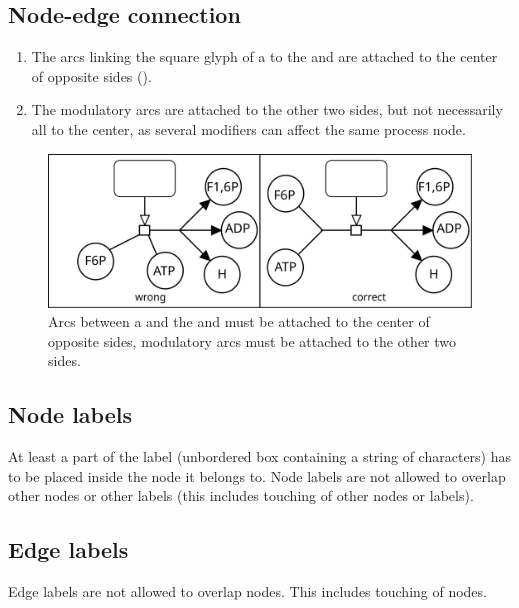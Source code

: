 \subsection{Node-edge connection}

\begin{enumerate}
\item The arcs linking the square glyph of a  to the
   and  are attached to the
  center of opposite sides ().
\item The modulatory arcs are attached to the other two sides, but not
  necessarily all to the center, as several modifiers can affect the
  same process node.
\end{enumerate}

\begin{figure}[htb]
  \centering
  \includegraphics[scale=0.3]{images/layout-connecting-arcs}
  \caption{Arcs between a   and the  and  must be attached to the center of opposite sides, modulatory
  arcs must be attached to the other two sides.}\label{fig:layout6}
\end{figure}

\subsection{Node labels}

At least a part of the label (unbordered box containing a string of
characters) has to be placed inside the node it belongs to. Node
labels are not allowed to overlap other nodes or other labels (this
includes touching of other nodes or labels).

\subsection{Edge labels}

Edge labels are not allowed to overlap nodes. This includes touching
of nodes.

